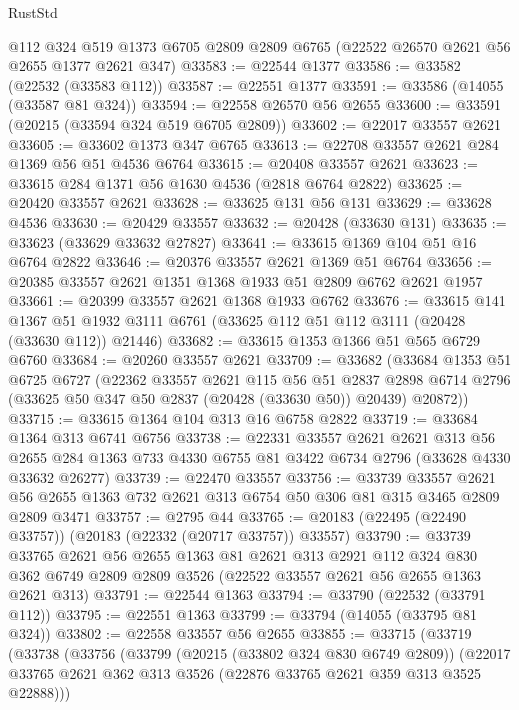 \begin{lexlean}{RustStd}
\begin{coremodule}
    @112
    @324
    @519
    @1373
    @6705
    @2809
    @2809
    @6765
    (@22522 @26570 @2621 @56 @2655 @1377 @2621 @347)
@33583 := @22544 @1377
@33586 := @33582 (@22532 (@33583 @112))
@33587 := @22551 @1377
@33591 := @33586 (@14055 (@33587 @81 @324))
@33594 := @22558 @26570 @56 @2655
@33600 := @33591 (@20215 (@33594 @324 @519 @6705 @2809))
@33602 := @22017 @33557 @2621
@33605 := @33602 @1373 @347 @6765
@33613 := @22708 @33557 @2621 @284 @1369 @56 @51 @4536 @6764
@33615 := @20408 @33557 @2621
@33623 := @33615 @284 @1371 @56 @1630 @4536 (@2818 @6764 @2822)
@33625 := @20420 @33557 @2621
@33628 := @33625 @131 @56 @131
@33629 := @33628 @4536
@33630 := @20429 @33557
@33632 := @20428 (@33630 @131)
@33635 := @33623 (@33629 @33632 @27827)
@33641 := @33615 @1369 @104 @51 @16 @6764 @2822
@33646 := @20376 @33557 @2621 @1369 @51 @6764
@33656 := @20385 @33557 @2621 @1351 @1368 @1933 @51 @2809 @6762 @2621 @1957
@33661 := @20399 @33557 @2621 @1368 @1933 @6762
@33676 := @33615
    @141
    @1367
    @51
    @1932
    @3111
    @6761
    (@33625 @112 @51 @112 @3111 (@20428 (@33630 @112)) @21446)
@33682 := @33615 @1353 @1366 @51 @565 @6729 @6760
@33684 := @20260 @33557 @2621
@33709 := @33682
    (@33684
      @1353
      @51
      @6725
      @6727
      (@22362
        @33557
        @2621
        @115
        @56
        @51
        @2837
        @2898
        @6714
        @2796
        (@33625 @50 @347 @50 @2837 (@20428 (@33630 @50)) @20439)
        @20872))
@33715 := @33615 @1364 @104 @313 @16 @6758 @2822
@33719 := @33684 @1364 @313 @6741 @6756
@33738 := @22331
    @33557
    @2621
    @2621
    @313
    @56
    @2655
    @284
    @1363
    @733
    @4330
    @6755
    @81
    @3422
    @6734
    @2796
    (@33628 @4330 @33632 @26277)
@33739 := @22470 @33557
@33756 := @33739
    @33557
    @2621
    @56
    @2655
    @1363
    @732
    @2621
    @313
    @6754
    @50
    @306
    @81
    @315
    @3465
    @2809
    @2809
    @3471
@33757 := @2795 @44
@33765 := @20183 (@22495 (@22490 @33757)) (@20183 (@22332 (@20717 @33757)) @33557)
@33790 := @33739
    @33765
    @2621
    @56
    @2655
    @1363
    @81
    @2621
    @313
    @2921
    @112
    @324
    @830
    @362
    @6749
    @2809
    @2809
    @3526
    (@22522 @33557 @2621 @56 @2655 @1363 @2621 @313)
@33791 := @22544 @1363
@33794 := @33790 (@22532 (@33791 @112))
@33795 := @22551 @1363
@33799 := @33794 (@14055 (@33795 @81 @324))
@33802 := @22558 @33557 @56 @2655
@33855 := @33715
    (@33719
      (@33738
        (@33756
          (@33799
            (@20215 (@33802 @324 @830 @6749 @2809))
            (@22017 @33765 @2621 @362 @313 @3526 (@22876 @33765 @2621 @359 @313 @3525 @22888)))

\end{coremodule}
\end{lexlean}
